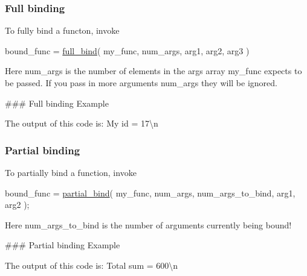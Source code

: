 \subsubsection*{Full binding}

To fully bind a functon, invoke 
\begin{DoxyCode}
bound\_func = \hyperlink{bind_8c_aba8492ffd71864427a5cddc0c3888454}{full\_bind}( my\_func, num\_args, arg1, arg2, arg3 )
\end{DoxyCode}
 Here {\ttfamily num\+\_\+args} is the number of elements in the {\ttfamily args} array {\ttfamily my\+\_\+func} expects to be passed. If you pass in more arguments {\ttfamily num\+\_\+args} they will be ignored.

\#\#\# Full binding Example 
 The output of this code is\+: {\ttfamily My id = 17\textbackslash{}n}

\subsubsection*{Partial binding}

To partially bind a function, invoke 
\begin{DoxyCode}
bound\_func = \hyperlink{bind_8c_a749a103d16b748b8aecff011472a0881}{partial\_bind}( my\_func, num\_args, num\_args\_to\_bind, arg1, arg2 );
\end{DoxyCode}
 Here {\ttfamily num\+\_\+args\+\_\+to\+\_\+bind} is the number of arguments currently being bound!

\#\#\# Partial binding Example 
 The output of this code is\+: {\ttfamily Total sum = 600\textbackslash{}n} 



